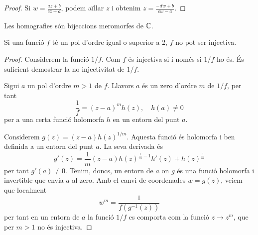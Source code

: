 \documentclass[dvipsnames, svgnames, leqno, a4paper, 12pt]{article}
\begin{document}
        \begin{proof}
            Si \begin{math}
                 w  = \frac{az+b}{cz+d} 
            \end{math}, podem aïllar $z$ i obtenim \begin{math}
                z = \frac{-d  w +b}{c w -a}
            \end{math}.
        \end{proof}

        \begin{corollary}
            Les homografies són bijeccions meromorfes de $\mathbb{C}$.
        \end{corollary}

        \begin{lemma}
            Si una funció $f$ té un pol d'ordre igual o superior a 2, $f$ no pot ser injectiva.  
        \end{lemma}

        \begin{proof}
            Considerem la funció $1/f$. Com $f$ és injectiva si i només si $1/f$ ho és. És suficient demostrar la no injectivitat de $1/f$.
            
            Sigui $a$ un pol d'ordre $m>1$ de $f$. Llavors $a$ és un zero d'ordre $m$ de $1/f$, per tant 
            \begin{displaymath}
                \frac{1}{f}=(z-a)^mh(z),\quad  h(a)\neq0
            \end{displaymath} 
            per a una certa funció holomorfa $h$ en un entorn del punt $a$.

            Considerem $ g(z)=(z-a)h(z)^{1/m}$. Aquesta funció és holomorfa i ben definida a un entorn del punt $a$. La seva derivada és 
            \begin{displaymath}
                g'(z)=\frac{1}{m}(z-a)h(z)^{\frac{1}{m}-1}h'(z)+h(z)^{\frac{1}{m}}
            \end{displaymath} 
            per tant $g'(a)\neq0$.
            Tenim, doncs, un entorn de $a$ on $g$ és una funció holomorfa i invertible que envia $a$ al zero. Amb el canvi de coordenades $ w  = g(z)$, veiem que localment 
            \begin{displaymath}
                 w ^m = \frac{1}{f(g^{-1}(z))}
            \end{displaymath} 
            per tant en un entorn de $a$ la funció $1/f$ es comporta com la funció $z\to z^m$, que per $m>1$ no és injectiva.
        \end{proof}
\end{document}
